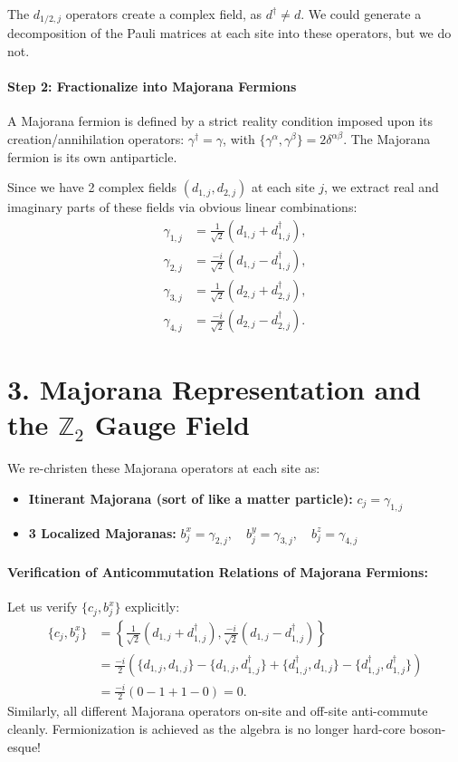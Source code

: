 \documentclass[11pt,a4paper]{article}
\begin{document}
The $d_{1/2,j}$ operators create a complex field, as $d^\dagger \neq d$. We could generate a decomposition of the Pauli matrices at each site into these operators, but we do not.

\paragraph{Step 2: Fractionalize into Majorana Fermions}
A Majorana fermion is defined by a strict reality condition imposed upon its creation/annihilation operators: $\gamma^\dagger = \gamma$, with $\{\gamma^\alpha, \gamma^\beta\} = 2\delta^{\alpha\beta}$. The Majorana fermion is its own antiparticle.

Since we have 2 complex fields $(d_{1,j}, d_{2,j})$ at each site $j$, we extract real and imaginary parts of these fields via obvious linear combinations:
\begin{align}
    \gamma_{1,j} &= \frac{1}{\sqrt{2}} \left( d_{1,j} + d_{1,j}^\dagger \right), \\
    \gamma_{2,j} &= \frac{-i}{\sqrt{2}} \left( d_{1,j} - d_{1,j}^\dagger \right), \\
    \gamma_{3,j} &= \frac{1}{\sqrt{2}} \left( d_{2,j} + d_{2,j}^\dagger \right), \\
    \gamma_{4,j} &= \frac{-i}{\sqrt{2}} \left( d_{2,j} - d_{2,j}^\dagger \right).
\end{align}


\section*{3. Majorana Representation and the $\mathbb{Z}_2$ Gauge Field}

We re-christen these Majorana operators at each site as:
\begin{itemize}
    \item \textbf{Itinerant Majorana (sort of like a matter particle):} $c_j = \gamma_{1,j}$
    \item \textbf{3 Localized Majoranas:} $b_j^x = \gamma_{2,j}, \quad b_j^y = \gamma_{3,j}, \quad b_j^z = \gamma_{4,j}$
\end{itemize}

\paragraph{Verification of Anticommutation Relations of Majorana Fermions:}
Let us verify $\{c_j, b_j^x\}$ explicitly:
\begin{align}
    \{c_j, b_j^x\} &= \left\{ \frac{1}{\sqrt{2}}(d_{1,j} + d_{1,j}^\dagger), \frac{-i}{\sqrt{2}}(d_{1,j} - d_{1,j}^\dagger) \right\} \nonumber \\
    &= \frac{-i}{2} \left( \{d_{1,j}, d_{1,j}\} - \{d_{1,j}, d_{1,j}^\dagger\} + \{d_{1,j}^\dagger, d_{1,j}\} - \{d_{1,j}^\dagger, d_{1,j}^\dagger\} \right) \nonumber \\
    &= \frac{-i}{2} \left( 0 - 1 + 1 - 0 \right) = 0.
\end{align}
Similarly, all different Majorana operators on-site and off-site anti-commute cleanly. Fermionization is achieved as the algebra is no longer hard-core boson-esque!
\end{document}

